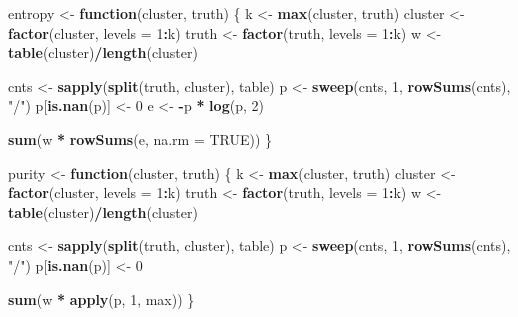 \documentclass[
  notitlepage]{book}
\newenvironment{Shaded}{\begin{snugshade}}{\end{snugshade}}
\newcommand{\ControlFlowTok}[1]{\textcolor[rgb]{0.13,0.29,0.53}{\textbf{#1}}}
\newcommand{\DataTypeTok}[1]{\textcolor[rgb]{0.13,0.29,0.53}{#1}}
\newcommand{\DecValTok}[1]{\textcolor[rgb]{0.00,0.00,0.81}{#1}}
\newcommand{\KeywordTok}[1]{\textcolor[rgb]{0.13,0.29,0.53}{\textbf{#1}}}
\newcommand{\NormalTok}[1]{#1}
\newcommand{\OperatorTok}[1]{\textcolor[rgb]{0.81,0.36,0.00}{\textbf{#1}}}
\newcommand{\OtherTok}[1]{\textcolor[rgb]{0.56,0.35,0.01}{#1}}
\newcommand{\StringTok}[1]{\textcolor[rgb]{0.31,0.60,0.02}{#1}}
\begin{document}
\begin{Shaded}
\begin{Highlighting}[]
\NormalTok{entropy \textless{}{-}}\StringTok{ }\ControlFlowTok{function}\NormalTok{(cluster, truth) \{}
\NormalTok{  k \textless{}{-}}\StringTok{ }\KeywordTok{max}\NormalTok{(cluster, truth)}
\NormalTok{  cluster \textless{}{-}}\StringTok{ }\KeywordTok{factor}\NormalTok{(cluster, }\DataTypeTok{levels =} \DecValTok{1}\OperatorTok{:}\NormalTok{k)}
\NormalTok{  truth \textless{}{-}}\StringTok{ }\KeywordTok{factor}\NormalTok{(truth, }\DataTypeTok{levels =} \DecValTok{1}\OperatorTok{:}\NormalTok{k)}
\NormalTok{  w \textless{}{-}}\StringTok{ }\KeywordTok{table}\NormalTok{(cluster)}\OperatorTok{/}\KeywordTok{length}\NormalTok{(cluster)}

\NormalTok{  cnts \textless{}{-}}\StringTok{ }\KeywordTok{sapply}\NormalTok{(}\KeywordTok{split}\NormalTok{(truth, cluster), table)}
\NormalTok{  p \textless{}{-}}\StringTok{ }\KeywordTok{sweep}\NormalTok{(cnts, }\DecValTok{1}\NormalTok{, }\KeywordTok{rowSums}\NormalTok{(cnts), }\StringTok{"/"}\NormalTok{)}
\NormalTok{  p[}\KeywordTok{is.nan}\NormalTok{(p)] \textless{}{-}}\StringTok{ }\DecValTok{0}
\NormalTok{  e \textless{}{-}}\StringTok{ }\OperatorTok{{-}}\NormalTok{p }\OperatorTok{*}\StringTok{ }\KeywordTok{log}\NormalTok{(p, }\DecValTok{2}\NormalTok{)}

  \KeywordTok{sum}\NormalTok{(w }\OperatorTok{*}\StringTok{ }\KeywordTok{rowSums}\NormalTok{(e, }\DataTypeTok{na.rm =} \OtherTok{TRUE}\NormalTok{))}
\NormalTok{\}}

\NormalTok{purity \textless{}{-}}\StringTok{ }\ControlFlowTok{function}\NormalTok{(cluster, truth) \{}
\NormalTok{  k \textless{}{-}}\StringTok{ }\KeywordTok{max}\NormalTok{(cluster, truth)}
\NormalTok{  cluster \textless{}{-}}\StringTok{ }\KeywordTok{factor}\NormalTok{(cluster, }\DataTypeTok{levels =} \DecValTok{1}\OperatorTok{:}\NormalTok{k)}
\NormalTok{  truth \textless{}{-}}\StringTok{ }\KeywordTok{factor}\NormalTok{(truth, }\DataTypeTok{levels =} \DecValTok{1}\OperatorTok{:}\NormalTok{k)}
\NormalTok{  w \textless{}{-}}\StringTok{ }\KeywordTok{table}\NormalTok{(cluster)}\OperatorTok{/}\KeywordTok{length}\NormalTok{(cluster)}

\NormalTok{  cnts \textless{}{-}}\StringTok{ }\KeywordTok{sapply}\NormalTok{(}\KeywordTok{split}\NormalTok{(truth, cluster), table)}
\NormalTok{  p \textless{}{-}}\StringTok{ }\KeywordTok{sweep}\NormalTok{(cnts, }\DecValTok{1}\NormalTok{, }\KeywordTok{rowSums}\NormalTok{(cnts), }\StringTok{"/"}\NormalTok{)}
\NormalTok{  p[}\KeywordTok{is.nan}\NormalTok{(p)] \textless{}{-}}\StringTok{ }\DecValTok{0}

  \KeywordTok{sum}\NormalTok{(w }\OperatorTok{*}\StringTok{ }\KeywordTok{apply}\NormalTok{(p, }\DecValTok{1}\NormalTok{, max))}
\NormalTok{\}}
\end{Highlighting}
\end{Shaded}
\end{document}
